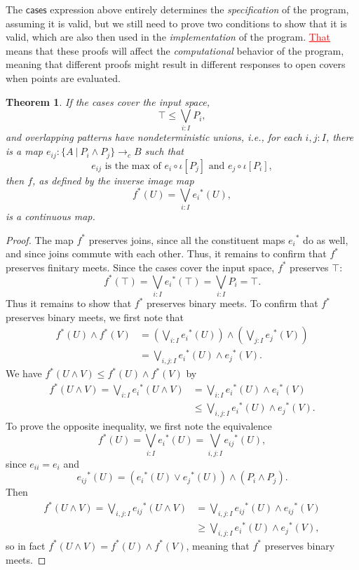 \documentclass[conference]{IEEEtran}
\newtheorem{theorem}{Theorem}
\newcommand{\cto}{\to_c}
\newcommand{\suchthat}{\ |\ }
\newcommand{\oinclf}[1]{\iota[{#1}]}
\newcommand{\isthemaxof}[3]{{#1}\text{ is the max of }{#2}\text{ and }{#3}}
\newcommand{\iimg}[1]{{#1}^*}
\newcommand{\grammar}[1]{\textcolor{red}{\underline{#1}}}
\begin{document}
The $\mathsf{cases}$ expression above entirely determines the \emph{specification} of the program, assuming it is valid, but we still need to prove two conditions to show that it is valid, which are also then used in the \emph{implementation} of the program. \grammar{That} means that these proofs will affect the \emph{computational} behavior of the program, meaning that different proofs might result in different responses to open covers when points are evaluated. 
\begin{theorem}
\label{pattern}
If the cases cover the input space,
\[
\top \le \bigvee_{i : I} P_i \tag{covering},
\]
and overlapping patterns have nondeterministic unions, i.e., for each $i, j : I$, there is a map $e_{ij} : \{A \suchthat P_i \wedge P_j \} \cto B$ such that
\[
\isthemaxof{ e_{ij} }{ e_i \circ \oinclf{P_j} }{ e_j \circ \oinclf{P_i} }, \tag{gluing}
\]
then $f$, as defined by the inverse image map
\[
\iimg{f}(U) = \bigvee_{i : I} \iimg{e_i}(U),
\]
is a continuous map.
\end{theorem}
\begin{proof}
The map $\iimg{f}$ preserves joins, since all the constituent maps $\iimg{e_i}$ do as well, and since joins commute with each other. Thus, it remains to confirm that $\iimg{f}$ preserves finitary meets.
Since the cases cover the input space, $\iimg{f}$ preserves $\top$:
\[
\iimg{f}(\top) = \bigvee_{i : I} \iimg{e_i}(\top) = \bigvee_{i : I}P_i = \top.
\]
Thus it remains to show that $\iimg{f}$ preserves binary meets.
To confirm that $\iimg{f}$ preserves binary meets, we first note that
\begin{align*}
\iimg{f}(U) \wedge \iimg{f}(V) 
  &= \left(\bigvee_{i : I} \iimg{e_i}(U) \right) \wedge \left( \bigvee_{j: I} \iimg{e_j}(V) \right)
\\ &= \bigvee_{i, j : I} \iimg{e_i}(U) \wedge \iimg{e_j}(V).
\end{align*}
We have $\iimg{f}(U \wedge V) \le \iimg{f}(U) \wedge \iimg{f}(V)$ by
\begin{align*}
\iimg{f}(U \wedge V)
  = \bigvee_{i : I} \iimg{e_i}(U \wedge V)
  &= \bigvee_{i : I} \iimg{e_i}(U) \wedge \iimg{e_i}(V)
  \\ &\le \bigvee_{i, j : I} \iimg{e_i}(U) \wedge \iimg{e_j}(V).
\end{align*}
To prove the opposite inequality, we first note the equivalence
\[
\iimg{f}(U) = \bigvee_{i : I} \iimg{e_i}(U) = \bigvee_{i, j : I} \iimg{e_{ij}}(U),
\]
since $e_{ii} = e_i$ and 
\[
\iimg{e_{ij}}(U) = \left( \iimg{e_i}(U) \vee \iimg{e_j}(U) \right) \wedge \left(P_i \wedge P_j \right).
\]
Then
\begin{align*}
\iimg{f}(U \wedge V)
  = \bigvee_{i, j : I} \iimg{e_{ij}}(U \wedge V)
  &= \bigvee_{i, j : I} \iimg{e_{ij}}(U) \wedge \iimg{e_{ij}}(V)
  \\ &\ge \bigvee_{i, j : I} \iimg{e_i}(U) \wedge \iimg{e_j}(V),
\end{align*}
so in fact $\iimg{f}(U \wedge V) = \iimg{f}(U) \wedge \iimg{f}(V)$, meaning that $\iimg{f}$ preserves binary meets.
\end{proof}
\end{document}
